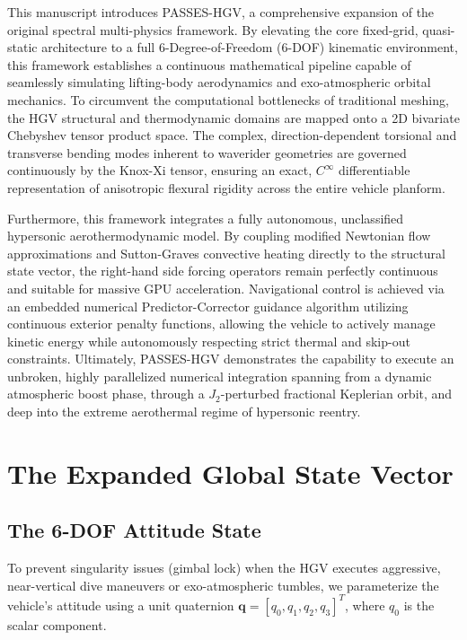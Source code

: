 \documentclass[11pt,a4paper]{article}
\theoremstyle{definition}
\numberwithin{equation}{section}
\begin{document}
This manuscript introduces PASSES-HGV, a comprehensive expansion of the original spectral multi-physics framework. By elevating the core fixed-grid, quasi-static architecture to a full 6-Degree-of-Freedom (6-DOF) kinematic environment, this framework establishes a continuous mathematical pipeline capable of seamlessly simulating lifting-body aerodynamics and exo-atmospheric orbital mechanics. To circumvent the computational bottlenecks of traditional meshing, the HGV structural and thermodynamic domains are mapped onto a 2D bivariate Chebyshev tensor product space. The complex, direction-dependent torsional and transverse bending modes inherent to waverider geometries are governed continuously by the Knox-Xi tensor, ensuring an exact, $C^\infty$ differentiable representation of anisotropic flexural rigidity across the entire vehicle planform.

Furthermore, this framework integrates a fully autonomous, unclassified hypersonic aerothermodynamic model. By coupling modified Newtonian flow approximations and Sutton-Graves convective heating directly to the structural state vector, the right-hand side forcing operators remain perfectly continuous and suitable for massive GPU acceleration. Navigational control is achieved via an embedded numerical Predictor-Corrector guidance algorithm utilizing continuous exterior penalty functions, allowing the vehicle to actively manage kinetic energy while autonomously respecting strict thermal and skip-out constraints. Ultimately, PASSES-HGV demonstrates the capability to execute an unbroken, highly parallelized numerical integration spanning from a dynamic atmospheric boost phase, through a $J_2$-perturbed fractional Keplerian orbit, and deep into the extreme aerothermal regime of hypersonic reentry.

\section{The Expanded Global State Vector}
\label{sec:global_state_vector}

\subsection{The 6-DOF Attitude State}
To prevent singularity issues (gimbal lock) when the HGV executes aggressive, near-vertical dive maneuvers or exo-atmospheric tumbles, we parameterize the vehicle's attitude using a unit quaternion $\mathbf{q} = [q_0, q_1, q_2, q_3]^T$, where $q_0$ is the scalar component.
\end{document}
